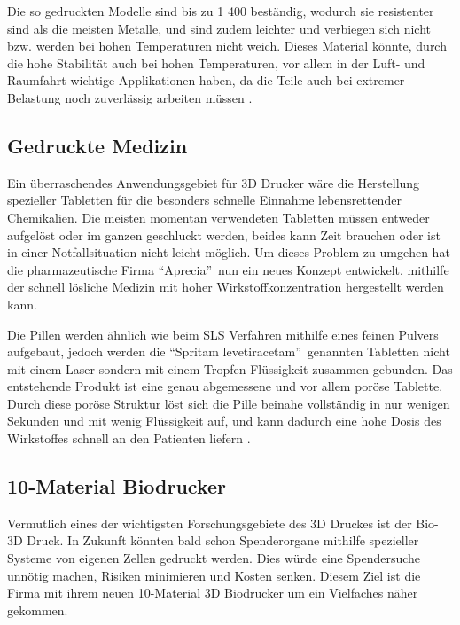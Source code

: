 Die so gedruckten Modelle sind bis zu 1 400 \TEMP beständig, wodurch sie resistenter sind als die meisten Metalle, und sind zudem leichter und verbiegen sich nicht bzw. werden bei hohen Temperaturen nicht weich.
Dieses Material könnte, durch die hohe Stabilität auch bei hohen Temperaturen, vor allem in der Luft- und Raumfahrt wichtige Applikationen haben, da die Teile auch bei extremer Belastung noch zuverlässig arbeiten müssen \parencite{HiTempCeram}.



\subsection{Gedruckte Medizin}

Ein überraschendes Anwendungsgebiet für 3D Drucker wäre die Herstellung spezieller Tabletten für die besonders schnelle Einnahme lebensrettender Chemikalien. Die meisten momentan verwendeten Tabletten müssen entweder aufgelöst oder im ganzen geschluckt werden, beides kann Zeit brauchen oder ist in einer Notfallsituation nicht leicht möglich. Um dieses Problem zu umgehen hat die pharmazeutische Firma \textquotedblleft Aprecia\textquotedblright ~nun ein neues Konzept entwickelt, mithilfe der schnell lösliche Medizin mit hoher Wirkstoffkonzentration hergestellt werden kann.

Die Pillen werden ähnlich wie beim SLS Verfahren mithilfe eines feinen Pulvers aufgebaut, jedoch werden die \textquotedblleft Spritam levetiracetam\textquotedblright ~genannten Tabletten nicht mit einem Laser sondern mit einem Tropfen Flüssigkeit zusammen gebunden. Das entstehende Produkt ist eine genau abgemessene und vor allem poröse Tablette. Durch diese poröse Struktur löst sich die Pille beinahe vollständig in nur wenigen Sekunden und mit wenig Flüssigkeit auf, und kann dadurch eine hohe Dosis des Wirkstoffes schnell an den Patienten liefern \parencite{Printed_Drug}.

\subsection{10-Material Biodrucker}

Vermutlich eines der wichtigsten Forschungsgebiete des 3D Druckes ist der Bio-3D Druck. In Zukunft könnten bald schon Spenderorgane mithilfe spezieller Systeme von eigenen Zellen gedruckt werden. Dies würde eine Spendersuche unnötig machen, Risiken minimieren und Kosten senken. Diesem Ziel ist die Firma  mit ihrem neuen 10-Material 3D Biodrucker um ein Vielfaches näher gekommen.

